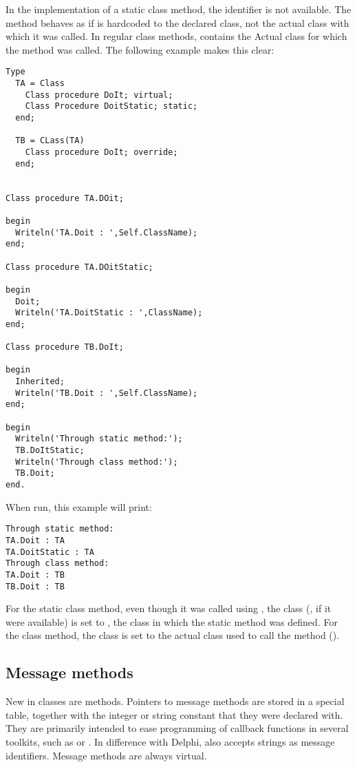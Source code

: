 In the implementation of a static class method, the  identifier is
not available. The method behaves as if  is hardcoded to the
declared class, not the actual class with which it was called. In regular
class methods,  contains the Actual class for which the method was
called.  The following example makes this clear:
\begin{verbatim}
Type
  TA = Class
    Class procedure DoIt; virtual;
    Class Procedure DoitStatic; static;
  end;

  TB = CLass(TA)
    Class procedure DoIt; override;
  end;


Class procedure TA.DOit;

begin
  Writeln('TA.Doit : ',Self.ClassName);
end;

Class procedure TA.DOitStatic;

begin
  Doit;
  Writeln('TA.DoitStatic : ',ClassName);
end;

Class procedure TB.DoIt;

begin
  Inherited;
  Writeln('TB.Doit : ',Self.ClassName);
end;

begin
  Writeln('Through static method:');
  TB.DoItStatic;
  Writeln('Through class method:');
  TB.Doit;
end.
\end{verbatim}
When run, this example will print:
\begin{verbatim}
Through static method:
TA.Doit : TA
TA.DoitStatic : TA
Through class method:
TA.Doit : TB
TB.Doit : TB
\end{verbatim}
For the static class method, even though it was called using , the class
(, if it were available) is set to , the class in which the
static method was defined.
For the class method, the class is set to the actual class used to call the method
().

\subsection{Message methods}
New in classes are  methods. Pointers to message methods are
stored in a special table, together with the integer or string constant that
they were declared with. They are primarily intended to ease programming of
callback functions in several  toolkits, such as  or
. In difference with Delphi, \fpc also accepts strings as message
identifiers. Message methods are always virtual.
 

